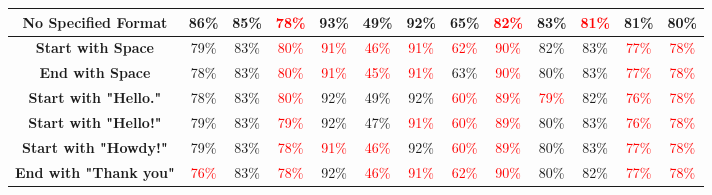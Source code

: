 \documentclass[11pt, dvipsnames]{article}
\begin{document}
\begin{table}
\begin{tabular}{|c|c|c|c|c|c|c|c|c|c|c|c||c|}
		\hline
		\textbf{\textcolor{Output Formats}{No Specified Format}} & \textcolor{happygreen}{86\%} & \textcolor{happygreen}{85\%} & \textcolor{red}{78\%} & \textcolor{happygreen}{93\%} & \textcolor{happygreen}{49\%} &     92\% & \textcolor{happygreen}{65\%} & \textcolor{red}{82\%} & \textcolor{happygreen}{83\%} & \textcolor{red}{81\%} & \textcolor{happygreen}{81\%} & \textcolor{happygreen}{80\%}\\
		\hline
		\textbf{\textcolor{Perturbations}{Start with Space}} & \textcolor{happygreen}{79\%} &     83\% & \textcolor{red}{80\%} & \textcolor{red}{91\%} & \textcolor{red}{46\%} & \textcolor{red}{91\%} & \textcolor{red}{62\%} & \textcolor{red}{90\%} & \textcolor{happygreen}{82\%} & \textcolor{happygreen}{83\%} & \textcolor{red}{77\%} & \textcolor{red}{78\%}\\
		\hline
		\textbf{\textcolor{Perturbations}{End with Space}} &     78\% &     83\% & \textcolor{red}{80\%} & \textcolor{red}{91\%} & \textcolor{red}{45\%} & \textcolor{red}{91\%} &     63\% & \textcolor{red}{90\%} &     80\% & \textcolor{happygreen}{83\%} & \textcolor{red}{77\%} & \textcolor{red}{78\%}\\
		\hline
		\textbf{\textcolor{Perturbations}{Start with "Hello."}} &     78\% &     83\% & \textcolor{red}{80\%} &     92\% & \textcolor{happygreen}{49\%} &     92\% & \textcolor{red}{60\%} & \textcolor{red}{89\%} & \textcolor{red}{79\%} &     82\% & \textcolor{red}{76\%} & \textcolor{red}{78\%}\\
		\hline
		\textbf{\textcolor{Perturbations}{Start with "Hello!"}} & \textcolor{happygreen}{79\%} &     83\% & \textcolor{red}{79\%} &     92\% &     47\% & \textcolor{red}{91\%} & \textcolor{red}{60\%} & \textcolor{red}{89\%} &     80\% & \textcolor{happygreen}{83\%} & \textcolor{red}{76\%} & \textcolor{red}{78\%}\\
		\hline
		\textbf{\textcolor{Perturbations}{Start with "Howdy!"}} & \textcolor{happygreen}{79\%} &     83\% & \textcolor{red}{78\%} & \textcolor{red}{91\%} & \textcolor{red}{46\%} &     92\% & \textcolor{red}{60\%} & \textcolor{red}{89\%} &     80\% & \textcolor{happygreen}{83\%} & \textcolor{red}{77\%} & \textcolor{red}{78\%}\\
		\hline
		\textbf{\textcolor{Perturbations}{End with "Thank you"}} & \textcolor{red}{76\%} &     83\% & \textcolor{red}{78\%} &     92\% & \textcolor{red}{46\%} & \textcolor{red}{91\%} & \textcolor{red}{62\%} & \textcolor{red}{90\%} &     80\% &     82\% & \textcolor{red}{77\%} & \textcolor{red}{78\%}\\

\end{tabular}
\end{table}
\end{document}
